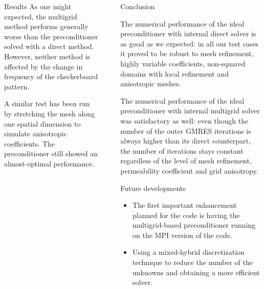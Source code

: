 \documentclass[final]{beamer}
\newlength{\sepwid}
\newlength{\onecolwid}
\begin{document}
\begin{frame}[t]
\begin{columns}[t]
\begin{column}{\onecolwid}
\begin{block}{Results}
As one might expected, the multigrid method performs generally worse than the
preconditioner solved with a direct method. However, neither method is
affected by the change in frequency of the checkerboard pattern.

A similar test has been run by stretching the mesh along one spatial dimension
to simulate anisotropic coefficients. The preconditioner
still showed an almost-optimal performance.
\end{block}

\end{column} %

\begin{column}{\sepwid}\end{column} %

\begin{column}{\onecolwid} %


\begin{block}{Conclusion}

The numerical performance of the ideal preconditioner with internal direct
solver is as good as we expected: in all our test cases it proved to be robust
to mesh refinement, highly variable coefficients, non-squared domains with
local refinement and anisotropic meshes.

The numerical performance of the ideal preconditioner with internal
multigrid solver was satisfactory as well: even though the number of the outer
GMRES iterations is always higher than its direct counterpart, the number of
iterations stays constant regardless of the level of mesh refinement,
permeability coefficient and grid anisotropy.

\end{block}

\begin{block}{Future developments}

\begin{itemize}
    \item The first important enhancement planned for the code is having the
          multigrid-based preconditioner running on the MPI version of the code.
    \item Using a mixed-hybrid discretization technique to reduce the number of the
          unknowns and obtaining a more efficient solver.
\end{itemize}


\end{block}
\end{column}
\end{columns}
\end{frame}
\end{document}
